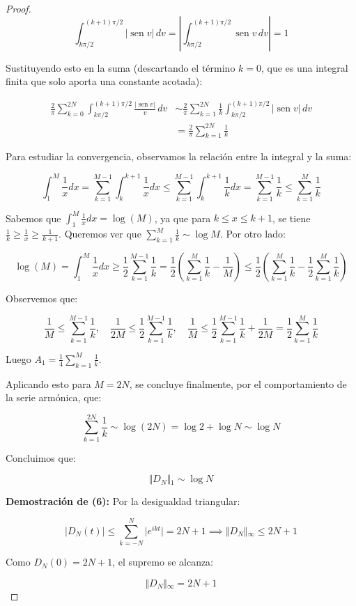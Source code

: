 \begin{proof}
$$\int_{k\pi/2}^{(k+1)\pi/2} \vert{}\operatorname{sen} v\vert{} \, dv = \left\vert{} \int_{k\pi/2}^{(k+1)\pi/2} \operatorname{sen} v \, dv \right\vert{} = 1$$

Sustituyendo esto en la suma (descartando el término $k=0$, que es una integral finita que solo aporta una constante acotada):


$$\begin{aligned}\frac{2}{\pi} \sum_{k=0}^{2N} \int_{k\pi/2}^{(k+1)\pi/2} \frac{\vert{}\operatorname{sen} v\vert{}}{v} \, dv &\sim \frac{2}{\pi} \sum_{k=1}^{2N} \frac{1}{k} \int_{k\pi/2}^{(k+1)\pi/2} \vert{}\operatorname{sen} v\vert{} \, dv \\ &= \frac{2}{\pi} \sum_{k=1}^{2N} \frac{1}{k}\end{aligned}$$

Para estudiar la convergencia, observamos la relación entre la integral y la suma:


$$\int_1^M \frac{1}{x} dx = \sum_{k=1}^{M-1} \int_k^{k+1} \frac{1}{x} dx \le \sum_{k=1}^{M-1} \int_k^{k+1} \frac{1}{k} dx = \sum_{k=1}^{M-1} \frac{1}{k} \le \sum_{k=1}^M \frac{1}{k}$$

Sabemos que $\int_1^M \frac{1}{x} dx = \log(M)$, ya que para $k \le x \le k+1$, se tiene $\frac{1}{k} \ge \frac{1}{x} \ge \frac{1}{k+1}$. Queremos ver que $\sum_{k=1}^M \frac{1}{k} \sim \log M$.
Por otro lado:


$$\log(M) = \int_1^M \frac{1}{x} dx \ge \frac{1}{2} \sum_{k=1}^{M-1} \frac{1}{k} = \frac{1}{2} \left( \sum_{k=1}^M \frac{1}{k} - \frac{1}{M} \right) \le \frac{1}{2} \left( \sum_{k=1}^M \frac{1}{k} - \frac{1}{2} \sum_{k=1}^M \frac{1}{k} \right)$$

Observemos que:


$$\frac{1}{M} \le \sum_{k=1}^{M-1} \frac{1}{k}, \quad \frac{1}{2M} \le \frac{1}{2} \sum_{k=1}^{M-1} \frac{1}{k}, \quad \frac{1}{M} \le \frac{1}{2} \sum_{k=1}^{M-1} \frac{1}{k} + \frac{1}{2M} = \frac{1}{2} \sum_{k=1}^M \frac{1}{k}$$


Luego $A_1 = \frac{1}{4} \sum_{k=1}^M \frac{1}{k}$.

Aplicando esto para $M=2N$, se concluye finalmente, por el comportamiento de la serie armónica, que:


$$\sum_{k=1}^{2N} \frac{1}{k} \sim \log(2N) = \log 2 + \log N \sim \log N$$

Concluimos que:


$$\Vert{}D_N\Vert{}_1 \sim \log N$$

\medskip
\textbf{Demostración de (6):}
Por la desigualdad triangular:


$$\vert{}D_N(t)\vert{} \le \sum_{k=-N}^N \vert{}e^{ikt}\vert{} = 2N + 1 \implies \Vert{}D_N\Vert{}_\infty \le 2N + 1$$


Como $D_N(0) = 2N + 1$, el supremo se alcanza:


$$\Vert{}D_N\Vert{}_\infty = 2N + 1$$


\end{proof}

